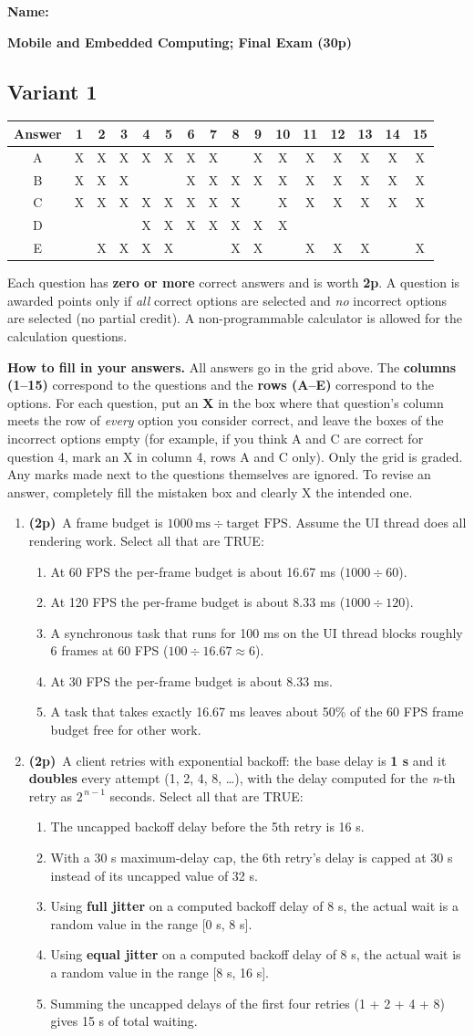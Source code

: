 \documentclass[11pt]{article}
\newcommand{\pts}{\textbf{(2p)}~}
\newcommand{\nameheader}{%
  \noindent\textbf{Name:}~\underline{\hspace{8cm}}\par\vspace{4pt}
}
\newcommand{\examtitle}{%
  \begin{center}
  {\large\bfseries Mobile and Embedded Computing; Final Exam (30p)}
  \end{center}
  \vspace{-4pt}
}
\newcommand{\answergridone}{%
  \begin{center}
  \renewcommand{\arraystretch}{1.6}
  \begin{tabular}{|c|*{15}{c|}}
  \hline
  Answer & 1 & 2 & 3 & 4 & 5 & 6 & 7 & 8 & 9 & 10 & 11 & 12 & 13 & 14 & 15 \\
  \hline
  A & X & X & X & X & X & X & X &   & X & X & X & X & X & X & X \\
  \hline
  B & X & X & X &   &   & X & X & X & X & X & X & X & X & X & X \\
  \hline
  C & X & X & X & X & X & X & X & X &   & X & X & X & X & X & X \\
  \hline
  D &   &   &   & X & X & X & X & X & X & X &   &   &   &   &   \\
  \hline
  E &   & X & X & X & X &   &   & X & X &   & X & X & X &   & X \\
  \hline
  \end{tabular}
  \end{center}
}
\newcommand{\instructions}{%
  \small
  \noindent Each question has \textbf{zero or more} correct answers and is worth \textbf{2p}. A question is awarded points only if \emph{all} correct options are selected and \emph{no} incorrect options are selected (no partial credit). A non-programmable calculator is allowed for the calculation questions.

  \smallskip
  \noindent\textbf{How to fill in your answers.} All answers go in the grid above. The \textbf{columns (1--15)} correspond to the questions and the \textbf{rows (A--E)} correspond to the options. For each question, put an \textbf{X} in the box where that question's column meets the row of \emph{every} option you consider correct, and leave the boxes of the incorrect options empty (for example, if you think A and C are correct for question 4, mark an X in column 4, rows A and C only). Only the grid is graded. Any marks made next to the questions themselves are ignored. To revise an answer, completely fill the mistaken box and clearly X the intended one.
  \normalsize\par\smallskip
}
\begin{document}
  \nameheader
  \examtitle

  \subsection*{Variant 1}

  \answergridone

  \instructions

  \begin{enumerate}

    \item \pts A frame budget is $1000\,\text{ms} \div \text{target FPS}$. Assume the UI thread does all rendering work. Select all that are TRUE:
    \begin{enumerate}
      \item At 60 FPS the per-frame budget is about 16.67 ms ($1000 \div 60$).
      \item At 120 FPS the per-frame budget is about 8.33 ms ($1000 \div 120$).
      \item A synchronous task that runs for 100 ms on the UI thread blocks roughly 6 frames at 60 FPS ($100 \div 16.67 \approx 6$).
      \item At 30 FPS the per-frame budget is about 8.33 ms.
      \item A task that takes exactly 16.67 ms leaves about 50\% of the 60 FPS frame budget free for other work.
    \end{enumerate}

    \item \pts A client retries with exponential backoff: the base delay is \textbf{1 s} and it \textbf{doubles} every attempt (1, 2, 4, 8, \dots), with the delay computed for the \emph{n}-th retry as $2^{\,n-1}$ seconds. Select all that are TRUE:
    \begin{enumerate}
      \item The uncapped backoff delay before the 5th retry is 16 s.
      \item With a 30 s maximum-delay cap, the 6th retry's delay is capped at 30 s instead of its uncapped value of 32 s.
      \item Using \textbf{full jitter} on a computed backoff delay of 8 s, the actual wait is a random value in the range [0 s, 8 s].
      \item Using \textbf{equal jitter} on a computed backoff delay of 8 s, the actual wait is a random value in the range [8 s, 16 s].
      \item Summing the uncapped delays of the first four retries (1 + 2 + 4 + 8) gives 15 s of total waiting.
    \end{enumerate}


\end{enumerate}
\end{document}
